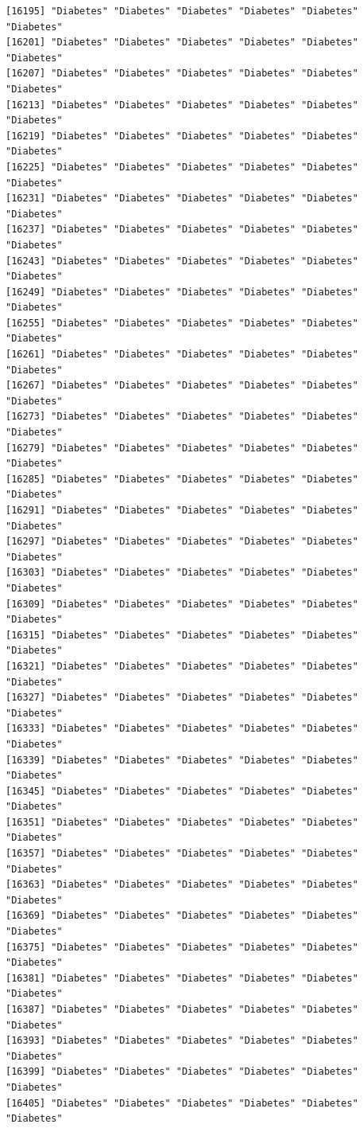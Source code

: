 \documentclass[
  letterpaper,
  DIV=11,
  numbers=noendperiod]{scrartcl}
\begin{document}
\begin{verbatim}
[16195] "Diabetes" "Diabetes" "Diabetes" "Diabetes" "Diabetes" "Diabetes"
[16201] "Diabetes" "Diabetes" "Diabetes" "Diabetes" "Diabetes" "Diabetes"
[16207] "Diabetes" "Diabetes" "Diabetes" "Diabetes" "Diabetes" "Diabetes"
[16213] "Diabetes" "Diabetes" "Diabetes" "Diabetes" "Diabetes" "Diabetes"
[16219] "Diabetes" "Diabetes" "Diabetes" "Diabetes" "Diabetes" "Diabetes"
[16225] "Diabetes" "Diabetes" "Diabetes" "Diabetes" "Diabetes" "Diabetes"
[16231] "Diabetes" "Diabetes" "Diabetes" "Diabetes" "Diabetes" "Diabetes"
[16237] "Diabetes" "Diabetes" "Diabetes" "Diabetes" "Diabetes" "Diabetes"
[16243] "Diabetes" "Diabetes" "Diabetes" "Diabetes" "Diabetes" "Diabetes"
[16249] "Diabetes" "Diabetes" "Diabetes" "Diabetes" "Diabetes" "Diabetes"
[16255] "Diabetes" "Diabetes" "Diabetes" "Diabetes" "Diabetes" "Diabetes"
[16261] "Diabetes" "Diabetes" "Diabetes" "Diabetes" "Diabetes" "Diabetes"
[16267] "Diabetes" "Diabetes" "Diabetes" "Diabetes" "Diabetes" "Diabetes"
[16273] "Diabetes" "Diabetes" "Diabetes" "Diabetes" "Diabetes" "Diabetes"
[16279] "Diabetes" "Diabetes" "Diabetes" "Diabetes" "Diabetes" "Diabetes"
[16285] "Diabetes" "Diabetes" "Diabetes" "Diabetes" "Diabetes" "Diabetes"
[16291] "Diabetes" "Diabetes" "Diabetes" "Diabetes" "Diabetes" "Diabetes"
[16297] "Diabetes" "Diabetes" "Diabetes" "Diabetes" "Diabetes" "Diabetes"
[16303] "Diabetes" "Diabetes" "Diabetes" "Diabetes" "Diabetes" "Diabetes"
[16309] "Diabetes" "Diabetes" "Diabetes" "Diabetes" "Diabetes" "Diabetes"
[16315] "Diabetes" "Diabetes" "Diabetes" "Diabetes" "Diabetes" "Diabetes"
[16321] "Diabetes" "Diabetes" "Diabetes" "Diabetes" "Diabetes" "Diabetes"
[16327] "Diabetes" "Diabetes" "Diabetes" "Diabetes" "Diabetes" "Diabetes"
[16333] "Diabetes" "Diabetes" "Diabetes" "Diabetes" "Diabetes" "Diabetes"
[16339] "Diabetes" "Diabetes" "Diabetes" "Diabetes" "Diabetes" "Diabetes"
[16345] "Diabetes" "Diabetes" "Diabetes" "Diabetes" "Diabetes" "Diabetes"
[16351] "Diabetes" "Diabetes" "Diabetes" "Diabetes" "Diabetes" "Diabetes"
[16357] "Diabetes" "Diabetes" "Diabetes" "Diabetes" "Diabetes" "Diabetes"
[16363] "Diabetes" "Diabetes" "Diabetes" "Diabetes" "Diabetes" "Diabetes"
[16369] "Diabetes" "Diabetes" "Diabetes" "Diabetes" "Diabetes" "Diabetes"
[16375] "Diabetes" "Diabetes" "Diabetes" "Diabetes" "Diabetes" "Diabetes"
[16381] "Diabetes" "Diabetes" "Diabetes" "Diabetes" "Diabetes" "Diabetes"
[16387] "Diabetes" "Diabetes" "Diabetes" "Diabetes" "Diabetes" "Diabetes"
[16393] "Diabetes" "Diabetes" "Diabetes" "Diabetes" "Diabetes" "Diabetes"
[16399] "Diabetes" "Diabetes" "Diabetes" "Diabetes" "Diabetes" "Diabetes"
[16405] "Diabetes" "Diabetes" "Diabetes" "Diabetes" "Diabetes" "Diabetes"

\end{verbatim}
\end{document}
